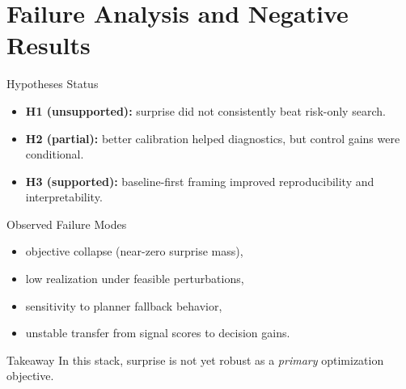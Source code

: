 \section{Failure Analysis and Negative Results}

\begin{frame}{Hypotheses Status}
\begin{itemize}
    \item \textbf{H1 (unsupported):} surprise did not consistently beat risk-only search.
    \item \textbf{H2 (partial):} better calibration helped diagnostics, but control gains were conditional.
    \item \textbf{H3 (supported):} baseline-first framing improved reproducibility and interpretability.
\end{itemize}
\end{frame}

\begin{frame}{Observed Failure Modes}
\begin{itemize}
    \item objective collapse (near-zero surprise mass),
    \item low realization under feasible perturbations,
    \item sensitivity to planner fallback behavior,
    \item unstable transfer from signal scores to decision gains.
\end{itemize}
\vspace{0.4em}
\begin{block}{Takeaway}
In this stack, surprise is not yet robust as a \emph{primary} optimization objective.
\end{block}
\end{frame}
